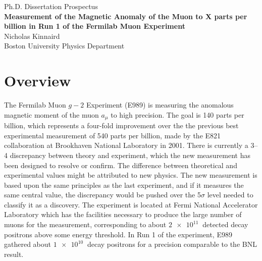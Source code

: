 \documentclass[12pt,letterpaper]{article}
\def\gmtwo{$g-2$\xspace}
\def\amu{$a_{\mu}$\xspace}
\begin{document}
\begin{center}
\Large{Ph.D. Dissertation Prospectus} \\\vspace{5mm}
\textbf{\Large{Measurement of the Magnetic Anomaly of the Muon to X parts per billion in Run 1 of the Fermilab Muon  Experiment}} \\\vspace{5mm}
\large{Nicholas Kinnaird} \\\vspace{5mm}
\large{Boston University Physics Department} \\\vspace{5mm}
\end{center}


\section*{Overview}


The Fermilab Muon \gmtwo Experiment (E989) is measuring the anomalous magnetic moment of the muon \amu to high precision. The goal is 140 parts per billion, which represents a four-fold improvement over the the previous best experimental measurement of 540 parts per billion, made by the E821 collaboration at Brookhaven National Laboratory in 2001. There is currently a \SIrange{3}{4}{\sigma} discrepancy between theory and experiment, which the new measurement has been designed to resolve or confirm. The difference between theoretical and experimental values might be attributed to new physics. The new measurement is based upon the same principles as the last experiment, and if it measures the same central value, the discrepancy would be pushed over the 5$\sigma$ level needed to classify it as a discovery. The experiment is located at Fermi National Accelerator Laboratory which has the facilities necessary to produce the large number of muons for the measurement, corresponding to about $\SI{2e11}{}$ detected decay positrons above some energy threshold. In Run 1 of the experiment, E989 gathered about $\SI{1e10}{}$ decay positrons for a precision comparable to the BNL result.


\end{document}
